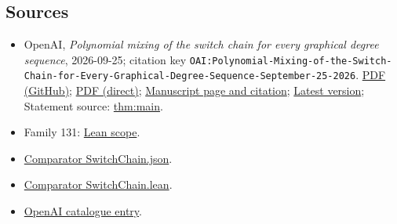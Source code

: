\documentclass[11pt]{article}
\begin{document}
\subsection{Sources}
\begin{itemize}
\item OpenAI, \emph{Polynomial mixing of the switch chain for every graphical degree sequence}, 2026-09-25; citation key \texttt{OAI:Polynomial-Mixing-of-the-Switch-Chain-for-Every-Graphical-Degree-Sequence-September-25-2026}. \href{https://github.com/openai/math/blob/adc7f1241b42e322a6451854ab7e4b4c146bf78a/preprints/Polynomial-Mixing-of-the-Switch-Chain-for-Every-Graphical-Degree-Sequence-September-25-2026/main.pdf}{PDF (GitHub)}; \href{https://github.com/openai/math/raw/adc7f1241b42e322a6451854ab7e4b4c146bf78a/preprints/Polynomial-Mixing-of-the-Switch-Chain-for-Every-Graphical-Degree-Sequence-September-25-2026/main.pdf}{PDF (direct)}; \href{https://github.com/openai/math/blob/adc7f1241b42e322a6451854ab7e4b4c146bf78a/preprints/Polynomial-Mixing-of-the-Switch-Chain-for-Every-Graphical-Degree-Sequence-September-25-2026/README.md}{Manuscript page and citation}; \href{https://github.com/openai/math/blob/main/preprints/Polynomial-Mixing-of-the-Switch-Chain-for-Every-Graphical-Degree-Sequence-September-25-2026/main.pdf}{Latest version}; Statement source: \href{https://github.com/openai/math/blob/adc7f1241b42e322a6451854ab7e4b4c146bf78a/preprints/Polynomial-Mixing-of-the-Switch-Chain-for-Every-Graphical-Degree-Sequence-September-25-2026/build/sections/introduction.tex\#L32}{thm:main}.
\item Family 131: \href{https://github.com/openai/math/blob/adc7f1241b42e322a6451854ab7e4b4c146bf78a/lean/docs/131.md}{Lean scope}.
\item \href{https://github.com/openai/math/blob/adc7f1241b42e322a6451854ab7e4b4c146bf78a/lean/ComparatorChallenges/SwitchChain.json}{Comparator SwitchChain.json}.
\item \href{https://github.com/openai/math/blob/adc7f1241b42e322a6451854ab7e4b4c146bf78a/lean/ComparatorChallenges/SwitchChain.lean}{Comparator SwitchChain.lean}.
\item \href{https://github.com/openai/math/blob/adc7f1241b42e322a6451854ab7e4b4c146bf78a/CONTENTS.md}{OpenAI catalogue entry}.
\end{itemize}
\end{document}
